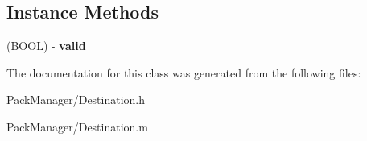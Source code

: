\subsection*{Instance Methods}
\begin{DoxyCompactItemize}
\item 
\hypertarget{interface_destination_ae33ba4170b0e92f1b94ae6f21f5c3dbb}{(B\-O\-O\-L) -\/ {\bfseries valid}}\label{interface_destination_ae33ba4170b0e92f1b94ae6f21f5c3dbb}

\end{DoxyCompactItemize}


The documentation for this class was generated from the following files\-:\begin{DoxyCompactItemize}
\item 
Pack\-Manager/Destination.\-h\item 
Pack\-Manager/Destination.\-m\end{DoxyCompactItemize}

